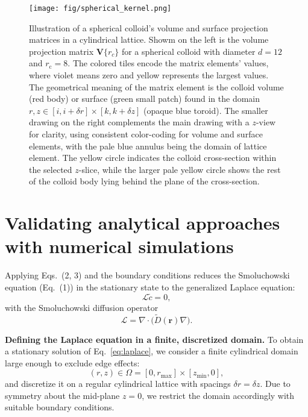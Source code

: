 \documentclass[10pt, a4paper, twocolumn]{article}
\begin{document}
\begin{figure}[H]
    \centering
    \texttt{[image: fig/spherical\_kernel.png]}
    \caption{
        Illustration of a spherical colloid's volume and surface projection matrices in a cylindrical lattice.
        Showm on the left is the volume projection matrix $\bm{V}\{r_c\}$ for a spherical colloid with diameter $d = 12$ and $r_{\text{c}}= 8$.
        The colored tiles encode the matrix elements' values, where violet means zero and yellow represents the largest values.
        The geometrical meaning of the matrix element is the colloid volume (red body) or surface (green small patch) found in the domain $r,z \in [i, i + \delta r] \times [k, k + \delta z]$ (opaque blue toroid).
        The smaller drawing on the right complements the main drawing with a $z$-view for clarity, using consistent color-coding for volume and surface elements, with the pale blue annulus being the domain of lattice element.
        The yellow circle indicates the colloid cross-section within the selected $z$-slice, while the larger pale yellow circle shows the rest of the colloid body lying behind the plane of the cross-section.
    }
    \label{fig:spherical_kernel}
\end{figure}


\pagebreak
\section{Validating analytical approaches with numerical simulations}

Applying Eqs.~(2, 3) and the boundary conditions reduces the Smoluchowski equation (Eq.~(1)) in the stationary state to the generalized Laplace equation:
\begin{equation}
  \mathcal L\tilde c=0,
  \label{eq:laplace}
\end{equation}
with the Smoluchowski diffusion operator
\begin{equation*}
  \mathcal L=\nabla\!\cdot\!\bigl(\tilde D(\bm r)\nabla\bigr).
\end{equation*}

\bigskip\noindent
\textbf{Defining the Laplace equation in a finite, discretized domain.}
To obtain a stationary solution of Eq.~\eqref{eq:laplace}, we consider a finite cylindrical domain large enough to exclude edge effects:
\begin{equation*}
  (r,z) \in \Omega = [0,r_{\max}]\times[z_{\min},0],
\end{equation*}
and discretize it on a regular cylindrical lattice with spacings $\delta r=\delta z$. 
Due to symmetry about the mid-plane $z = 0$, we restrict the domain accordingly with suitable boundary conditions.
\end{document}
